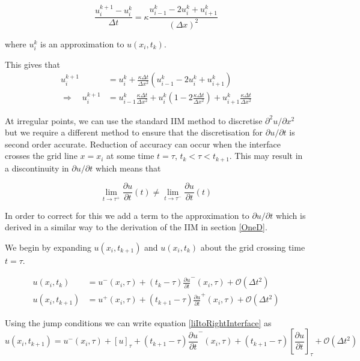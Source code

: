 \begin{equation}
    \frac{u_i^{k+1} - u_i^k}{\Delta t} = \kappa \frac{u_{i-1}^k - 2 u_i^k + u_{i+1}^k}{(\Delta x)^2}
\end{equation}

where $u_i^k$ is an approximation to $u(x_i,t_k)$.

This gives that
\begin{align}
    u_i^{k+1} &= u_i^k + \frac{\kappa \Delta t}{\Delta x^2} \left(u_{i-1}^k - 2 u_i^k + u_{i+1}^k\right) \\
    \Rightarrow \quad u_i^{k+1} &= u_{i-1}^k \frac{\kappa \Delta t}{\Delta x^2} + u_i^k \left(1 - 2 \frac{\kappa \Delta t}{\Delta x^2}\right) + u_{i+1}^k \frac{\kappa \Delta t}{\Delta x^2}
\end{align}

At irregular points, we can use the standard IIM method to discretise $\partial^2 u / \partial x^2$ but we require a different method to ensure that the discretisation for $\partial u / \partial t$ is second order accurate.
Reduction of accuracy can occur when the interface crosses the grid line $x=x_i$ at some time $t=\tau$, $t_k < \tau < t_{k+1}$.
This may result in a discontinuity in $\partial u / \partial t$ which means that

\begin{equation}
    \lim_{t \to \tau^+} \frac{\partial u}{\partial t}(t) \neq \lim_{t \to \tau^-} \frac{\partial u}{\partial t}(t)
\end{equation}

In order to correct for this we add a term to the approximation to $\partial u / \partial t$ which is derived in a similar way to the derivation of the IIM in section \ref{OneD}.

We begin by expanding $u(x_i,t_{k+1})$ and $u(x_i,t_k)$ about the grid crossing time $t=\tau$.

\begin{align}
    u(x_i,t_k) &= u^-(x_i,\tau) + (t_k - \tau)\frac{\partial u}{\partial t}^-(x_i,\tau) + \mathcal{O}(\Delta t^2) \\
    u(x_i,t_{k+1}) &= u^+(x_i,\tau) + (t_{k+1} - \tau)\frac{\partial u}{\partial t}^+(x_i,\tau) + \mathcal{O}(\Delta t^2) \label{liItoRightInterface}
\end{align}

Using the jump conditions we can write equation \ref{liItoRightInterface} as
\begin{equation}
    u(x_i,t_{k+1}) = u^-(x_i,\tau) + [u]_\tau + (t_{k+1} - \tau)\frac{\partial u}{\partial t}^-(x_i,\tau) + (t_{k+1} - \tau) \left[\frac{\partial u}{\partial t}\right]_\tau +  \mathcal{O}(\Delta t^2)
\end{equation}

